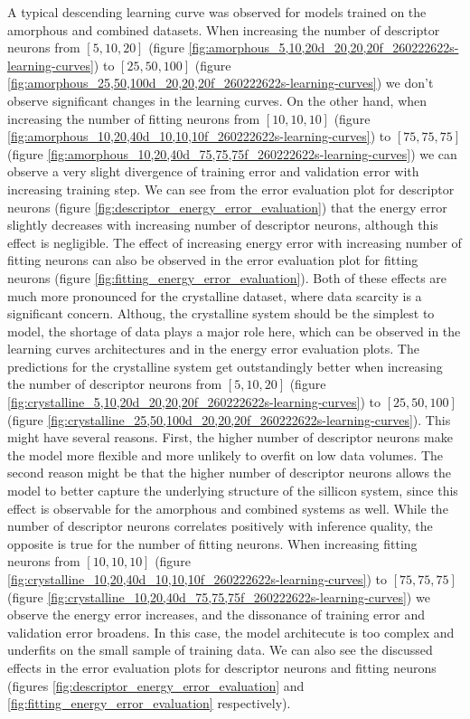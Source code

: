 A typical descending learning curve was observed for models trained on the
amorphous and combined datasets. When increasing the number of descriptor
neurons from $[5, 10, 20]$ (figure
\ref{fig:amorphous_5,10,20d_20,20,20f_260222622s-learning-curves}) to
$[25, 50, 100]$ (figure
\ref{fig:amorphous_25,50,100d_20,20,20f_260222622s-learning-curves}) we don't
observe significant changes in the learning curves. On the other hand, when
increasing the number of fitting neurons from $[10, 10, 10]$
(figure \ref{fig:amorphous_10,20,40d_10,10,10f_260222622s-learning-curves}) to
$[75, 75, 75]$ (figure
\ref{fig:amorphous_10,20,40d_75,75,75f_260222622s-learning-curves}) we can
observe a very slight divergence of training error and validation error with
increasing training step. We can see from the error evaluation plot for
descriptor neurons (figure \ref{fig:descriptor_energy_error_evaluation}) that
the energy error slightly decreases with increasing number of descriptor
neurons, although this effect is negligible. The effect of increasing energy
error with increasing number of fitting neurons can also be observed in the
error evaluation plot for fitting neurons (figure
\ref{fig:fitting_energy_error_evaluation}). Both of these effects are much
more pronounced for the crystalline dataset, where data scarcity is a
significant concern. Althoug, the crystalline system should be the simplest to
model, the shortage of data plays a major role here, which can be observed in
the learning curves architectures and in the energy error evaluation plots.
The predictions for the crystalline system get outstandingly better when
increasing the number of descriptor neurons from $[5, 10, 20]$ (figure
\ref{fig:crystalline_5,10,20d_20,20,20f_260222622s-learning-curves}) to
$[25, 50, 100]$ (figure
\ref{fig:crystalline_25,50,100d_20,20,20f_260222622s-learning-curves}). This
might have several reasons. First, the higher number of descriptor neurons
make the model more flexible and more unlikely to overfit on low data volumes.
The second reason might be that the higher number of descriptor neurons allows
the model to better capture the underlying structure of the sillicon system,
since this effect is observable for the amorphous and combined systems as
well. While the number of descriptor neurons correlates positively with
inference quality, the opposite is true for the number of fitting neurons.
When increasing fitting neurons from $[10, 10, 10]$
(figure \ref{fig:crystalline_10,20,40d_10,10,10f_260222622s-learning-curves})
to $[75, 75, 75]$
(figure \ref{fig:crystalline_10,20,40d_75,75,75f_260222622s-learning-curves})
we observe the energy error increases, and the dissonance of training error
and validation error broadens. In this case, the model architecute is too
complex and underfits on the small sample of training data. We can also see
the discussed effects in the error evaluation plots for descriptor neurons
and fitting neurons (figures \ref{fig:descriptor_energy_error_evaluation} and
\ref{fig:fitting_energy_error_evaluation} respectively).

